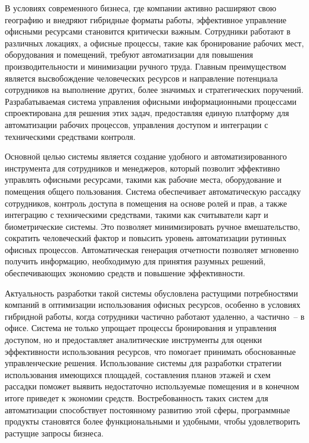 \label{sec:introduction}

В условиях современного бизнеса, где компании активно расширяют свою географию и внедряют гибридные форматы работы, эффективное управление офисными ресурсами становится критически важным. Сотрудники работают в различных локациях, а офисные процессы, такие как бронирование рабочих мест, оборудования и помещений, требуют автоматизации для повышения производительности и минимизации ручного труда. Главным преимуществом является высвобождение человеческих ресурсов и направление потенциала сотрудников на выполнение других, более значимых и стратегических поручений. Разрабатываемая система управления офисными информационными процессами спроектирована для решения этих задач, предоставляя единую платформу для автоматизации рабочих процессов, управления доступом и интеграции с техническими средствами контроля.

Основной целью системы является создание удобного и автоматизированного инструмента для сотрудников и менеджеров, который позволит эффективно управлять офисными ресурсами, такими как рабочие места, оборудование и помещения общего пользования. Система обеспечивает автоматическую рассадку сотрудников, контроль доступа в помещения на основе ролей и прав, а также интеграцию с техническими средствами, такими как считыватели карт и биометрические системы. Это позволяет минимизировать ручное вмешательство, сократить человеческий фактор и повысить уровень автоматизации рутинных офисных процессов. Автоматическая генерация отчетности позволяет мгновенно получить информацию, необходимую для принятия разумных решений, обеспечивающих экономию средств и повышение эффективности.

Актуальность разработки такой системы обусловлена растущими потребностями компаний в оптимизации использования офисных ресурсов, особенно в условиях гибридной работы, когда сотрудники частично работают удаленно, а частично~-- в офисе. Система не только упрощает процессы бронирования и управления доступом, но и предоставляет аналитические инструменты для оценки эффективности использования ресурсов, что помогает принимать обоснованные управленческие решения. Использование системы для разработки стратегии использования имеющихся площадей, составления планов этажей и схем рассадки поможет выявить недостаточно используемые помещения и в конечном итоге приведет к экономии средств. Востребованность таких систем для автоматизации способствует постоянному развитию этой сферы, программные продукты становятся более функциональными и удобными, чтобы удовлетворить растущие запросы бизнеса.

